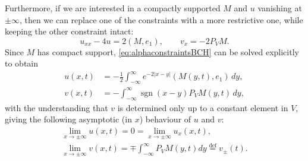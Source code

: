 \documentclass[10pt,a4paper]{article}
\numberwithin{equation}{section}
\theoremstyle{plain}
\theoremstyle{definition}
\newcommand{\abs}[1]{\left\lvert #1 \right\rvert}
\DeclareMathOperator{\sgn}{sgn}
\begin{document}
Furthermore, if we are interested in a compactly supported $M$ and $u$ vanishing at $\pm \infty$,  then we 
can replace one of the constraints with a more restrictive one,  while keeping the other constraint intact:  
\begin{equation} \label{eq:alphaconstraintsBCH}
u_{xx}-4 u=2(M,e_1) , \qquad v_{x}=-2P_V M.
\end{equation} 
Since $M$ has compact support,  \autoref{eq:alphaconstraintsBCH} can be solved explicitly to obtain 
\begin{align}
u(x,t)&=-\frac{1}{2} \int_{-\infty}^\infty e^{-2\abs{x-y}}(M(y,t), e_1) \, dy, \label{eq:uD} \\
v(x,t)&= -\int_{-\infty}^\infty \sgn (x-y) P_V M(y,t) \, dy \label{eq:vD}, 
\end{align} 
with the understanding that $v$ is determined only up to a constant element in $V$, giving the following asymptotic (in $x$) behaviour of $u$ and $v$: 
\begin{equation} \label{eq:uvassD}
\begin{matrix}\lim_{x\rightarrow \pm \infty} u(x,t)=0=\lim_{x\rightarrow \pm \infty}u_x(x,t), \\ 
\lim_{x\rightarrow \pm \infty}v(x,t)=\mp  \int_{-\infty}^\infty P_V M(y,t) dy\stackrel{\text{def}}{=}v_{\pm}(t).   
\end{matrix}\end{equation}
\end{document}
